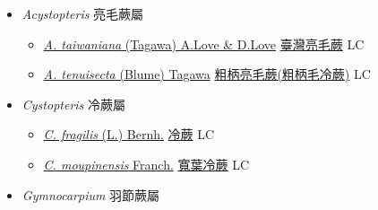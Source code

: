 
  \begin{itemize}
 \item[] \textit{Acystopteris} 亮毛蕨屬
                    
  \begin{itemize}
        \item[] \href{http://www.theplantlist.org/tpl1.1/search?q=Acystopteris+taiwaniana}{\textit{A. taiwaniana} (Tagawa) A.Love \& D.Love}   \href{\detokenize{http://taibnet.sinica.edu.tw/chi/taibnet_species_list.php?T2=臺灣亮毛蕨&T2_new_value=true&fr=y}}{臺灣亮毛蕨} LC
        \item[] \href{http://www.theplantlist.org/tpl1.1/search?q=Acystopteris+tenuisecta}{\textit{A. tenuisecta} (Blume) Tagawa}     \href{\detokenize{http://taibnet.sinica.edu.tw/chi/taibnet_species_list.php?T2=粗柄亮毛蕨&T2_new_value=true&fr=y}}{粗柄亮毛蕨(粗柄毛冷蕨)}   LC
  \end{itemize}
 \item[] \textit{Cystopteris} 冷蕨屬
                    
  \begin{itemize}
        \item[] \href{http://www.theplantlist.org/tpl1.1/search?q=Cystopteris+fragilis}{\textit{C. fragilis} (L.) Bernh.}   \href{\detokenize{http://taibnet.sinica.edu.tw/chi/taibnet_species_list.php?T2=冷蕨&T2_new_value=true&fr=y}}{冷蕨} LC
        \item[] \href{http://www.theplantlist.org/tpl1.1/search?q=Cystopteris+moupinensis}{\textit{C. moupinensis} Franch.}   \href{\detokenize{http://taibnet.sinica.edu.tw/chi/taibnet_species_list.php?T2=寬葉冷蕨&T2_new_value=true&fr=y}}{寬葉冷蕨} LC
  \end{itemize}
 \item[] \textit{Gymnocarpium} 羽節蕨屬
                    

\end{itemize}
